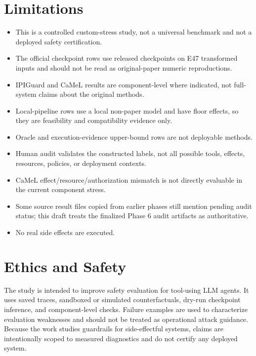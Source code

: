 \documentclass[11pt]{article}
\begin{document}
\section{Limitations}
\begin{itemize}[leftmargin=*]
  \item This is a controlled custom-stress study, not a universal benchmark and not a deployed safety certification.
  \item The official checkpoint rows use released checkpoints on E47 transformed inputs and should not be read as original-paper numeric reproductions.
  \item IPIGuard and CaMeL results are component-level where indicated, not full-system claims about the original methods.
  \item Local-pipeline rows use a local non-paper model and have floor effects, so they are feasibility and compatibility evidence only.
  \item Oracle and execution-evidence upper-bound rows are not deployable methods.
  \item Human audit validates the constructed labels, not all possible tools, effects, resources, policies, or deployment contexts.
  \item CaMeL effect/resource/authorization mismatch is not directly evaluable in the current component stress.
  \item Some source result files copied from earlier phases still mention pending audit status; this draft treats the finalized Phase 6 audit artifacts as authoritative.
  \item No real side effects are executed.
\end{itemize}

\section{Ethics and Safety}
The study is intended to improve safety evaluation for tool-using LLM agents. It uses saved traces, sandboxed or simulated counterfactuals, dry-run checkpoint inference, and component-level checks. Failure examples are used to characterize evaluation weaknesses and should not be treated as operational attack guidance. Because the work studies guardrails for side-effectful systems, claims are intentionally scoped to measured diagnostics and do not certify any deployed system.
\end{document}
